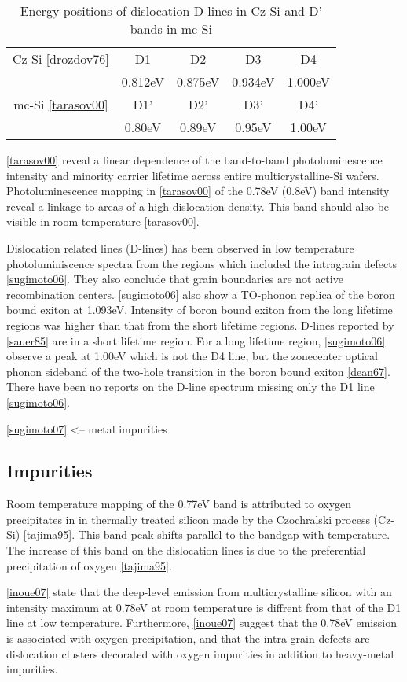 \begin{table}[H]
\centering
\begin{tabular}{|c|c|c|c|c|}
\hline
Cz-Si \ref{drozdov76} & D1 & D2 & D3 & D4 \\
	& 0.812eV & 0.875eV & 0.934eV & 1.000eV \\
\hline
mc-Si \ref{tarasov00} & D1' & D2' & D3' & D4' \\
		& 0.80eV & 0.89eV & 0.95eV & 1.00eV \\
\hline
\end{tabular}
\caption{Energy positions of dislocation D-lines in Cz-Si and D' bands in mc-Si}
\label{}
\end{table}


\ref{tarasov00} reveal a linear dependence of the band-to-band photoluminescence intensity and minority carrier lifetime across entire multicrystalline-Si wafers. Photoluminescence mapping in \ref{tarasov00} of the 0.78eV (0.8eV) band intensity reveal a linkage to areas of a high dislocation density. This band should also be visible in room temperature \ref{tarasov00}.


Dislocation related lines (D-lines) has been observed in low temperature photoluminiscence spectra from the regions which included the intragrain defects \ref{sugimoto06}. They also conclude that grain boundaries are not active recombination centers. \ref{sugimoto06} also show a TO-phonon replica of the boron bound exiton at 1.093eV. Intensity of boron bound exiton from the long lifetime regions was higher than that from the short lifetime regions. D-lines reported by \ref{sauer85} are in a short lifetime region. For a long lifetime region, \ref{sugimoto06} observe a peak at 1.00eV which is not the D4 line, but the zonecenter optical phonon sideband of the two-hole transition in the boron bound exiton \ref{dean67}. There have been no reports on the D-line spectrum missing only the D1 line \ref{sugimoto06}.

\ref{sugimoto07} <-- metal impurities










\subsection{Impurities}

Room temperature mapping of the 0.77eV band is attributed to oxygen precipitates in in thermally treated silicon made by the Czochralski process (Cz-Si) \ref{tajima95}. This band peak shifts parallel to the bandgap with temperature. The increase of this band on the dislocation lines is due to the preferential precipitation of oxygen \ref{tajima95}.


\ref{inoue07} state that the deep-level emission from multicrystalline silicon with an intensity maximum at 0.78eV at room temperature is diffrent from that of the D1 line at low temperature. Furthermore, \ref{inoue07} suggest that the 0.78eV emission is associated with oxygen precipitation, and that the intra-grain defects are dislocation clusters decorated with oxygen impurities in addition to heavy-metal impurities.